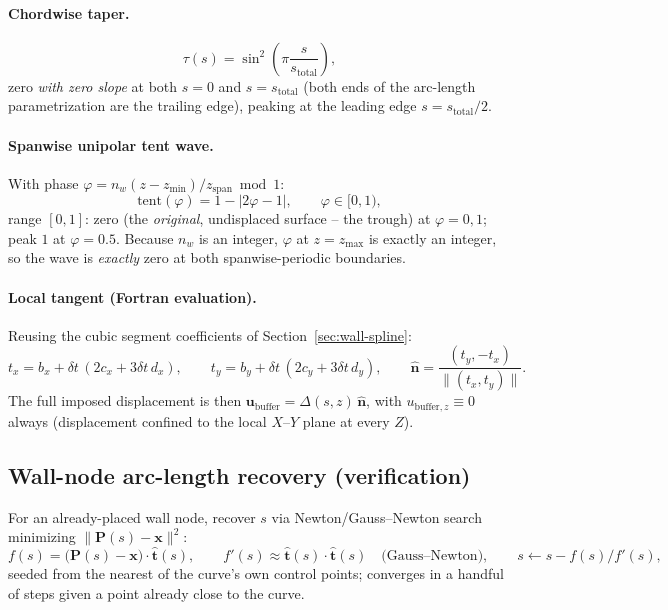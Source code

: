 \documentclass[11pt]{article}
\newcommand{\vecb}[1]{\bm{#1}}
\begin{document}
\paragraph{Chordwise taper.}
\begin{equation}
\tau(s) = \sin^2\!\left(\pi \frac{s}{s_{\text{total}}}\right),
\end{equation}
zero \emph{with zero slope} at both \(s=0\) and \(s=s_{\text{total}}\)
(both ends of the arc-length parametrization are the trailing edge),
peaking at the leading edge \(s = s_{\text{total}}/2\).

\paragraph{Spanwise unipolar tent wave.} With phase
\(\varphi = n_w (z-z_{\min})/z_{\text{span}} \bmod 1\):
\begin{equation}
\mathrm{tent}(\varphi) = 1 - |2\varphi - 1|, \qquad \varphi\in[0,1),
\end{equation}
range \([0,1]\): zero (the \emph{original}, undisplaced surface -- the
trough) at \(\varphi=0,1\); peak \(1\) at \(\varphi=0.5\). Because
\(n_w\) is an integer, \(\varphi\) at \(z=z_{\max}\) is exactly an
integer, so the wave is \emph{exactly} zero at both spanwise-periodic
boundaries.

\paragraph{Local tangent (Fortran evaluation).} Reusing the cubic
segment coefficients of Section~\ref{sec:wall-spline}:
\begin{equation}
t_x = b_x + \delta t\,(2c_x + 3\delta t\, d_x), \qquad
t_y = b_y + \delta t\,(2c_y + 3\delta t\, d_y), \qquad
\hat{\vecb{n}} = \frac{(t_y,-t_x)}{\lVert(t_x,t_y)\rVert} .
\end{equation}
The full imposed displacement is then
\(\vecb{u}_{\text{buffer}} = \Delta(s,z)\,\hat{\vecb{n}}\), with
\(u_{\text{buffer},z} \equiv 0\) always (displacement confined to the
local \(X\)–\(Y\) plane at every \(Z\)).

\subsection{Wall-node arc-length recovery (verification)}
\label{sec:newton-search}
For an already-placed wall node, recover \(s\) via Newton/Gauss--Newton
search minimizing \(\lVert \vecb{P}(s) - \vecb{x}\rVert^2\):
\begin{equation}
f(s) = \big(\vecb{P}(s)-\vecb{x}\big)\cdot\hat{\vecb{t}}(s), \qquad
f'(s) \approx \hat{\vecb{t}}(s)\cdot\hat{\vecb{t}}(s) \quad\text{(Gauss--Newton)}, \qquad
s \leftarrow s - f(s)/f'(s),
\end{equation}
seeded from the nearest of the curve's own control points; converges
in a handful of steps given a point already close to the curve.
\end{document}
